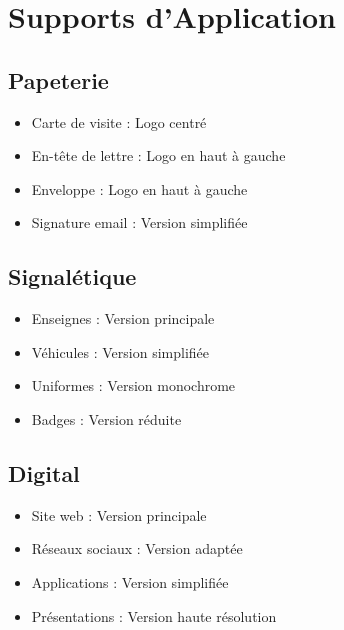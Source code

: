 \documentclass[11pt,a4paper]{report}
\begin{document}
\chapter{Supports d'Application}

\section{Papeterie}

\begin{tcolorbox}[title=Applications Bureautiques]
\begin{itemize}[label=]
    \item Carte de visite : Logo centré
    \item En-tête de lettre : Logo en haut à gauche
    \item Enveloppe : Logo en haut à gauche
    \item Signature email : Version simplifiée
\end{itemize}
\end{tcolorbox}

\section{Signalétique}

\begin{tcolorbox}[title=Applications Extérieures]
\begin{itemize}[label=]
    \item Enseignes : Version principale
    \item Véhicules : Version simplifiée
    \item Uniformes : Version monochrome
    \item Badges : Version réduite
\end{itemize}
\end{tcolorbox}

\section{Digital}

\begin{tcolorbox}[title=Applications Numériques]
\begin{itemize}[label=]
    \item Site web : Version principale
    \item Réseaux sociaux : Version adaptée
    \item Applications : Version simplifiée
    \item Présentations : Version haute résolution
\end{itemize}
\end{tcolorbox}
\end{document}
